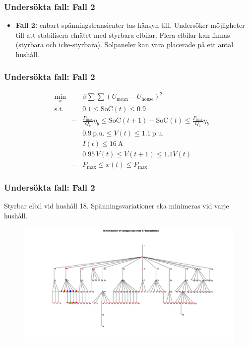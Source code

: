 \documentclass[noamsthm, swedish]{beamer}
\begin{document}
\begin{frame}
\frametitle{Undersökta fall: Fall 2}
    \begin{itemize}
        \item \textbf{Fall 2:} enbart spänningstransienter tas hänsyn till. Undersöker möjligheter till att stabilisera elnätet med styrbara elbilar. Flera elbilar kan finnas (styrbara och icke-styrbara). Solpaneler kan vara placerade på ett antal hushåll.
    \end{itemize}
\end{frame}

\begin{frame}
\frametitle{Undersökta fall: Fall 2}
\begin{equation*}
    \begin{aligned}
        & \underset{x}{\text{min}}
        & & \beta \sum \sum (U_\text{mean}-U_\text{house})^2 \\
        & \text{s.t.}
        & & 0.1 \leq \text{SoC}(t) \leq 0.9 \\
        & & - & \frac{P_\text{max}}{Q_b}\eta_b \leq \text{SoC}(t+1)-\text{SoC}(t) \leq \frac{P_\text{max}}{Q_b}\eta_b \\
        & & & 0.9 \: \text{p.u.} \leq V(t) \leq 1.1 \: \text{p.u.} \\
        & & & I(t) \leq 16 \: \text{A} \\
        & & & 0.95 \, V(t) \leq V(t+1) \leq 1.1 V(t) \\
        & & - & P_\text{max} \leq x(t) \leq P_\text{max}
    \end{aligned}
\end{equation*}
\end{frame}

\begin{frame}
\frametitle{Undersökta fall: Fall 2}
Styrbar elbil vid hushåll 18. Spänningsvariationer ska minimeras vid varje hushåll.
    \begin{figure}
        \centering
        \includegraphics[width = 0.83\linewidth]{templates/fig/tree_Uall_18_pdf.pdf}
    \end{figure}
\end{frame}
\end{document}
